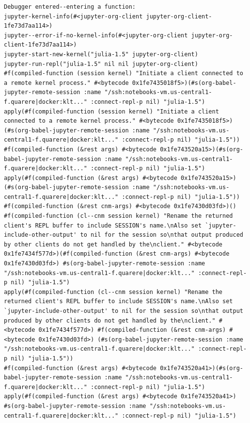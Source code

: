 \documentclass[11pt]{article}
\begin{document}
\begin{enumerate}
\begin{verbatim}
Debugger entered--entering a function:
jupyter-kernel-info(#<jupyter-org-client jupyter-org-client-1fe73d7aa114>)
jupyter--error-if-no-kernel-info(#<jupyter-org-client jupyter-org-client-1fe73d7aa114>)
jupyter-start-new-kernel("julia-1.5" jupyter-org-client)
jupyter-run-repl("julia-1.5" nil nil jupyter-org-client)
#f(compiled-function (session kernel) "Initiate a client connected to a remote kernel process." #<bytecode 0x1fe7435018f5>)(#s(org-babel-jupyter-remote-session :name "/ssh:notebooks-vm.us-central1-f.quarere|docker:klt..." :connect-repl-p nil) "julia-1.5")
apply(#f(compiled-function (session kernel) "Initiate a client connected to a remote kernel process." #<bytecode 0x1fe7435018f5>) (#s(org-babel-jupyter-remote-session :name "/ssh:notebooks-vm.us-central1-f.quarere|docker:klt..." :connect-repl-p nil) "julia-1.5"))
#f(compiled-function (&rest args) #<bytecode 0x1fe743520a15>)(#s(org-babel-jupyter-remote-session :name "/ssh:notebooks-vm.us-central1-f.quarere|docker:klt..." :connect-repl-p nil) "julia-1.5")
apply(#f(compiled-function (&rest args) #<bytecode 0x1fe743520a15>) (#s(org-babel-jupyter-remote-session :name "/ssh:notebooks-vm.us-central1-f.quarere|docker:klt..." :connect-repl-p nil) "julia-1.5"))
#f(compiled-function (&rest cnm-args) #<bytecode 0x1fe7430d03fd>)()
#f(compiled-function (cl--cnm session kernel) "Rename the returned client's REPL buffer to include SESSION's name.\nAlso set `jupyter-include-other-output' to nil for the session so\nthat output produced by other clients do not get handled by the\nclient." #<bytecode 0x1fe7434f577d>)(#f(compiled-function (&rest cnm-args) #<bytecode 0x1fe7430d03fd>) #s(org-babel-jupyter-remote-session :name "/ssh:notebooks-vm.us-central1-f.quarere|docker:klt..." :connect-repl-p nil) "julia-1.5")
apply(#f(compiled-function (cl--cnm session kernel) "Rename the returned client's REPL buffer to include SESSION's name.\nAlso set `jupyter-include-other-output' to nil for the session so\nthat output produced by other clients do not get handled by the\nclient." #<bytecode 0x1fe7434f577d>) #f(compiled-function (&rest cnm-args) #<bytecode 0x1fe7430d03fd>) (#s(org-babel-jupyter-remote-session :name "/ssh:notebooks-vm.us-central1-f.quarere|docker:klt..." :connect-repl-p nil) "julia-1.5"))
#f(compiled-function (&rest args) #<bytecode 0x1fe743520a41>)(#s(org-babel-jupyter-remote-session :name "/ssh:notebooks-vm.us-central1-f.quarere|docker:klt..." :connect-repl-p nil) "julia-1.5")
apply(#f(compiled-function (&rest args) #<bytecode 0x1fe743520a41>) #s(org-babel-jupyter-remote-session :name "/ssh:notebooks-vm.us-central1-f.quarere|docker:klt..." :connect-repl-p nil) "julia-1.5")

\end{verbatim}
\end{enumerate}
\end{document}
